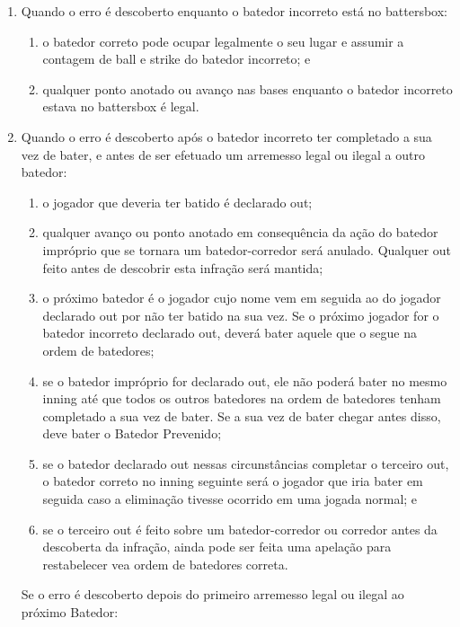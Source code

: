 \begin{enumerate}[label=(\alph*)]
	\item   Quando o erro é descoberto enquanto o batedor incorreto está no \gls{battersbox}:

	 \begin{enumerate}[label=\roman*.]
	 	\item o batedor correto pode ocupar legalmente o seu lugar e assumir a contagem de \gls{ball} e \gls{strike} do batedor incorreto; e
	\item qualquer ponto anotado ou avanço nas bases enquanto o batedor incorreto estava no \gls{battersbox} é legal.
	\end{enumerate}

\item  Quando o erro é descoberto após o batedor incorreto ter completado a sua  vez de bater, e antes de ser efetuado um arremesso legal ou ilegal a outro batedor:
	 \begin{enumerate}[label=\roman*.]
	 	\item  o jogador que deveria ter batido é declarado \gls{out};
	\item  qualquer avanço ou ponto anotado em consequência da ação do batedor impróprio que se tornara um batedor-corredor será anulado. Qualquer \gls{out} feito antes de descobrir esta infração será mantida;
	\item  o próximo batedor é o jogador cujo nome vem em seguida ao do jogador declarado \gls{out} por não ter batido na sua vez. Se o próximo jogador for o batedor incorreto declarado \gls{out}, deverá bater aquele que o segue na ordem de batedores;
	\item  se o batedor impróprio for declarado \gls{out}, ele não poderá bater no mesmo \gls{inning} até que todos os outros batedores na ordem de batedores tenham  completado a sua vez de bater. Se a sua vez de bater chegar antes disso, deve bater o Batedor Prevenido;
	\item  se o batedor declarado \gls{out} nessas circunstâncias completar o terceiro \gls{out}, o batedor correto no \gls{inning} seguinte será o jogador que iria bater em seguida caso a eliminação tivesse ocorrido em uma jogada normal; e
	\item  se o terceiro \gls{out} é feito sobre um batedor-corredor ou corredor antes da descoberta da infração, ainda pode ser feita uma apelação para restabelecer   vea ordem de batedores correta.
	\end{enumerate}

	 Se o erro é descoberto depois do primeiro arremesso legal ou ilegal ao próximo Batedor:


\end{enumerate}
